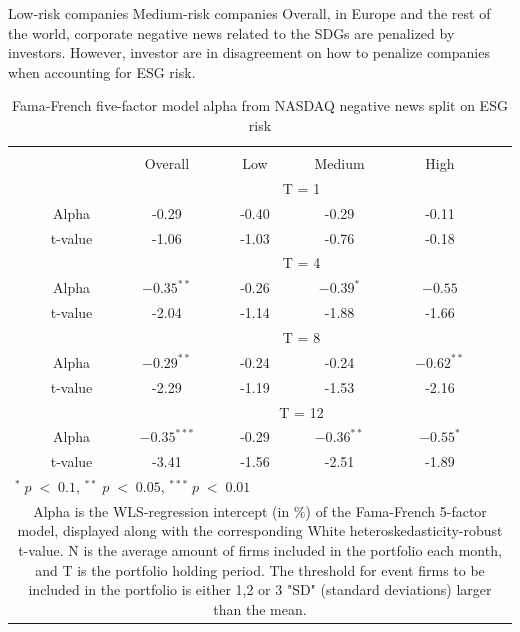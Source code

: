 Low-risk companies 
Medium-risk companies 
Overall, in Europe and the rest of the world, corporate negative news related to the SDGs are penalized by investors. However, investor are in disagreement on how to penalize companies when accounting for ESG risk.  
\setlength{\tabcolsep}{15pt}
\begin{table}[H]
\small
\centering
\caption{Fama-French five-factor model alpha from NASDAQ negative news split on ESG risk} 
\begin{tabular}{ccccccc}
\hline \hline \\ 
 &     & Overall &    Low  &  Medium  &  High &  \\    \cline{3-6} 
& &  \multicolumn{4}{c}{ T = 1} & \\ \cline{2-6}
& Alpha  & -0.29 & -0.40  & -0.29  & -0.11 &  \\ 
& t-value   & -1.06 & -1.03 & -0.76  & -0.18 &  \\
& &  \multicolumn{4}{c}{ T = 4} & \\ \cline{2-6}
& Alpha & $-0.35^{**}$  & -0.26  & $-0.39^{*}$  &  $-0.55$ & \\
& t-value &   -2.04 & -1.14 & -1.88  & -1.66 & \\
& &  \multicolumn{4}{c}{ T = 8} & \\ \cline{2-6}
& Alpha & $-0.29^{**}$ & -0.24  & -0.24  & $-0.62^{**}$ &  \\
& t-value & -2.29 & -1.19  & -1.53 & -2.16&  \\
& &  \multicolumn{4}{c}{ T = 12} & \\ \cline{2-6}
& Alpha  & $-0.35^{***}$ & -0.29  & $-0.36^{**}$  & $-0.55^{*}$ &  \\
& t-value & -3.41 & -1.56  & -2.51 & -1.89 &  \\
\hline \hline
 \multicolumn{7}{l}{ \footnotesize $^* \; p\; <\; 0.1$, $ ^{**} \; p\; <\; 0.05$, $ ^{***} \; p\; <\; 0.01$  } \\
 \multicolumn{7}{p{11.5cm}}{ \footnotesize Alpha is the WLS-regression intercept (in \%) of the Fama-French 5-factor model, displayed along with the corresponding White heteroskedasticity-robust t-value. N is the average amount of firms included in the portfolio each month, and T is the portfolio holding period. The threshold for event firms to be included in the portfolio is either 1,2 or 3 "SD" (standard deviations) larger than the mean.} \\ 
 \hline
\end{tabular}
\label{tab: FF5_neg_nasdaq}
\end{table}